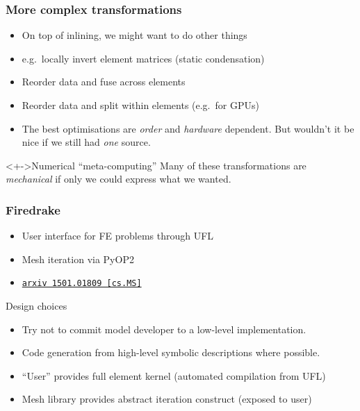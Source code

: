 \documentclass[presentation]{beamer}
\newcommand{\arxivlink}[2]{%
  \href{http://www.arxiv.org/abs/#1}%
  {{\small\texttt{arxiv\,#1\,[#2]}}}%
}
\begin{document}
\begin{frame}
  \frametitle{More complex transformations}
  \begin{itemize}[<+->]
  \item On top of inlining, we might want to do other things
  \item e.g.\ locally invert element matrices (static condensation)
  \item Reorder data and fuse across elements
  \item Reorder data and split within elements (e.g.\ for GPUs)
  \item The best optimisations are \emph{order} and \emph{hardware}
    dependent.  But wouldn't it be nice if we still had \emph{one}
    source.
  \end{itemize}
  \begin{block}<+->{Numerical ``meta-computing''}
    Many of these transformations are \emph{mechanical} if only we
    could express what we wanted.
  \end{block}
\end{frame}
\begin{frame}
  \frametitle{Firedrake}
  \begin{itemize}
  \item User interface for FE problems through
    UFL \parencite{Alnaes:2014}
  \item Mesh iteration via PyOP2 \parencite{Rathgeber:2012}
  \item \arxivlink{1501.01809}{cs.MS} 
  \end{itemize}
  \begin{block}{Design choices}
    \begin{itemize}[<+->]
    \item Try not to commit model developer to a low-level
      implementation.
    \item Code generation from high-level symbolic descriptions where
      possible.
    \item ``User'' provides full element kernel (automated compilation
      from UFL)
    \item Mesh library provides abstract iteration construct (exposed
      to user)
    \end{itemize}
  \end{block}
\end{frame}
\end{document}
